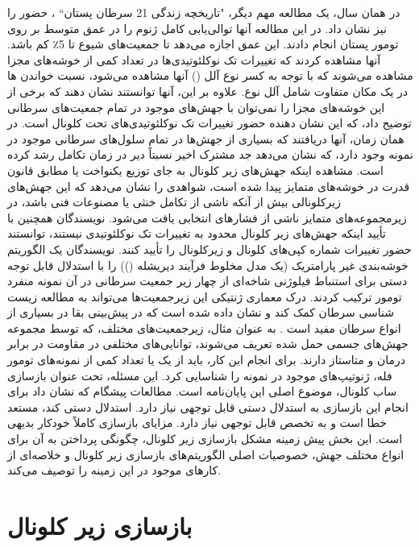 در همان سال، یک مطالعه مهم دیگر، "تاریخچه زندگی 21 سرطان پستان`` \cite{nik2012life}، حضور  را نیز نشان داد. در این مطالعه آنها توالی‌یابی کامل ژنوم را در عمق متوسط  بر روی تومور پستان  انجام دادند. این عمق اجازه می‌دهد تا جمعیت‌های شیوع تا 5٪ کم باشد. آنها مشاهده کردند که تغییرات تک نوکلئوتیدی‌ها در تعداد کمی از خوشه‌های مجزا مشاهده می‌شوند که با توجه به کسر نوع آلل () آنها مشاهده می‌شود، نسبت خواندن ها در یک مکان متفاوت شامل آلل نوع. علاوه بر این، آنها توانستند نشان دهند که برخی از این خوشه‌های مجزا را نمی‌توان با جهش‌های موجود در تمام جمعیت‌های سرطانی توضیح داد، که این نشان دهنده حضور تغییرات تک نوکلئوتیدی‌های تحت کلونال است. در همان زمان، آنها دریافتند که بسیاری از جهش‌ها در تمام سلول‌های سرطانی موجود در نمونه وجود دارد، که نشان می‌دهد جد مشترک اخیر نسبتاً دیر در زمان تکامل رشد کرده است. مشاهده اینکه جهش‌های زیر کلونال به جای توزیع یکنواخت یا مطابق قانون قدرت در خوشه‌های متمایز پیدا شده است، شواهدی را نشان می‌دهد که این جهش‌های زیرکلونالی بیش از آنکه ناشی از تکامل خنثی یا مصنوعات فنی باشد، در زیرمجموعه‌های متمایز ناشی از فشارهای انتخابی یافت می‌شود. نویسندگان همچنین با تأیید اینکه جهش‌های زیر کلونال محدود به تغییرات تک نوکلئوتیدی  نیستند، توانستند حضور تغییرات شماره کپی‌های کلونال و زیرکلونال را تأیید کنند. نویسندگان یک الگوریتم خوشه‌بندی غیر پارامتریک (یک مدل مخلوط فرآیند دیریشله ()) را با استدلال قابل توجه دستی برای استنباط فیلوژنی شاخه‌ای از چهار زیر جمعیت سرطانی در آن نمونه منفرد تومور ترکیب کردند. درک معماری ژنتیکی این زیرجمعیت‌ها می‌تواند به مطالعه زیست شناسی سرطان کمک کند و نشان داده شده است که در پیش‌بینی بقا در بسیاری از انواع سرطان مفید است \cite{andor2016pan}. به عنوان مثال، زیرجمعیت‌های مختلف، که توسط مجموعه جهش‌های جسمی حمل شده تعریف می‌شوند، توانایی‌های مختلفی در مقاومت در برابر درمان و متاستاز دارند. برای انجام این کار، باید از یک یا تعداد کمی از نمونه‌های تومور فله، ژنوتیپ‌های موجود در نمونه را شناسایی کرد. این مسئله، تحت عنوان بازسازی ساب کلونال، موضوع اصلی این پایان‌نامه است. مطالعات پیشگام که نشان داد  برای انجام این بازسازی به استدلال دستی قابل توجهی نیاز دارد. استدلال دستی کند، مستعد خطا است و به تخصص قابل توجهی نیاز دارد. مزایای بازسازی کاملاً خودکار بدیهی است. این بخش پیش زمینه مشکل بازسازی زیر کلونال، چگونگی پرداختن به آن برای انواع مختلف جهش، خصوصیات اصلی الگوریتم‌های بازسازی زیر کلونال و خلاصه‌ای از کارهای موجود در این زمینه را توصیف می‌کند.


\section{بازسازی زیر کلونال }

